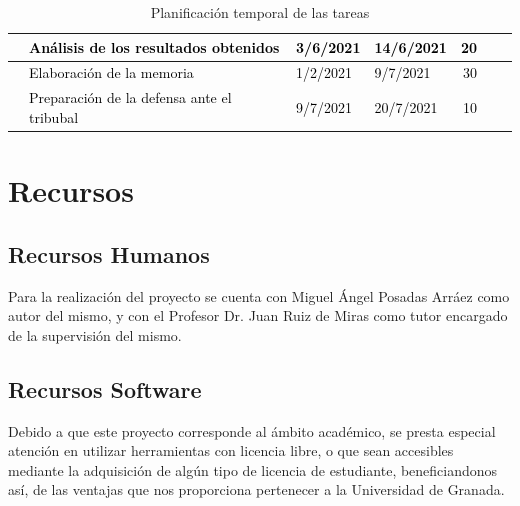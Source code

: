\begin{table}[H]
\begin{adjustbox}{angle=90, max height=\textheight}
\begin{tabular}{|clllrrl|}
    \hline
    \rowcolor{white} \multicolumn{1}{|l}{}  & \textcolor{black}{Análisis de los resultados obtenidos} & \textcolor{black}{3/6/2021}         & \textcolor{black}{14/6/2021} &\textcolor{black}{20}&\\
    \hline
    \rowcolor{white} \multicolumn{1}{|l}{}  & \textcolor{black}{Elaboración de la memoria} & \textcolor{black}{1/2/2021}         & \textcolor{black}{9/7/2021} &\textcolor{black}{30}&\\
    \hline
    \rowcolor{white} \multicolumn{1}{|l}{}  & \textcolor{black}{Preparación de la defensa ante el tribubal} & \textcolor{black}{9/7/2021}         & \textcolor{black}{20/7/2021} &\textcolor{black}{10}&\\                                  
    \hline
    \end{tabular}
    \end{adjustbox}
    \caption{Planificación temporal de las tareas}
    \label{fig:Planificacion}
\end{table}

\section{Recursos}
\subsection{Recursos Humanos}
Para la realización del proyecto se cuenta con Miguel Ángel Posadas Arráez como autor del mismo, y con el Profesor Dr. Juan Ruiz de Miras como tutor encargado de la supervisión del mismo.

\subsection{Recursos Software}
\label{RecursosSoftware}
Debido a que este proyecto corresponde al ámbito académico, se presta especial atención en utilizar herramientas con licencia libre, o que sean accesibles mediante la adquisición de algún tipo de licencia de estudiante, beneficiandonos así, de las ventajas que nos proporciona pertenecer a la Universidad de Granada.\\

